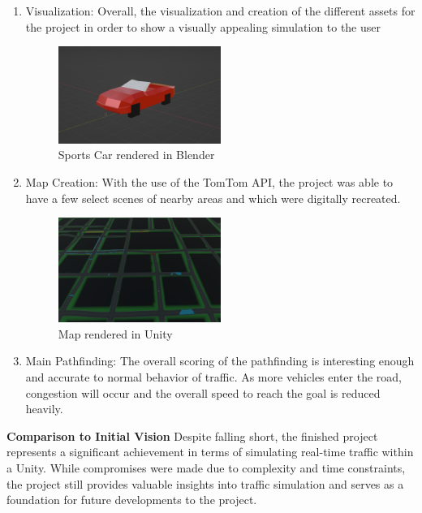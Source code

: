 \begin{enumerate}
	\item Visualization: Overall, the visualization and creation of the different assets for the project in order to show a visually appealing simulation to the user
	\begin{figure}[htbp]
	    \centering
	    \includegraphics[width=0.5\textwidth]{Images/SportsCar.png}
	    \caption{Sports Car rendered in Blender}
	    \label{fig:SportsCar}
	\end{figure}
	\item Map Creation: With the use of the TomTom API, the project was able to have a few select scenes of nearby areas and which were digitally recreated.
	\begin{figure}[htbp]
	    \centering
	    \includegraphics[width=0.5\textwidth]{Images/Map.png}
	    \caption{Map rendered in Unity}
	    \label{fig:Map}
	\end{figure}
	\item Main Pathfinding: The overall scoring of the pathfinding is interesting enough and accurate to normal behavior of traffic. As more vehicles enter the road, congestion will occur and the overall speed to reach the goal is reduced heavily.
\end{enumerate}
\textbf{Comparison to Initial Vision}
Despite falling short, the finished project represents a significant achievement in terms of simulating real-time traffic within a Unity. While compromises were made due to complexity and time constraints, the project still provides valuable insights into traffic simulation and serves as a foundation for future developments to the project.

